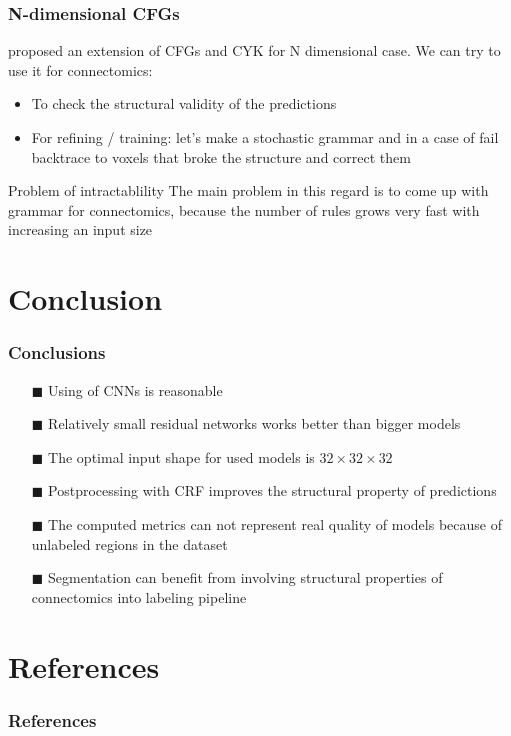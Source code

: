 \documentclass{beamer}
\begin{document}
\begin{frame}
    \frametitle{N-dimensional CFGs}
    \cite{schlesinger2013ten} proposed an extension of CFGs and CYK for N dimensional case. We can try to use it
    for connectomics:
    \begin{itemize}
        \item To check the structural validity of the predictions
        \item For refining / training: let's make a stochastic grammar and in a case of fail backtrace to
              voxels that broke the structure and correct them
    \end{itemize}
    \begin{alertblock}{Problem of intractablility}
        The main problem in this regard is to come up with grammar for connectomics, because the
        number of rules grows very fast with increasing an input size
    \end{alertblock}
\end{frame}

\section*{Conclusion}

\begin{frame}
    \frametitle{Conclusions}

    \begin{itemize}
        \item[$\blacksquare$] Using of CNNs is reasonable
        \item[$\blacksquare$] Relatively small residual networks works better than bigger models
        \item[$\blacksquare$] The optimal input shape for used models is \( 32 \times 32 \times 32 \)
        \item[$\blacksquare$] Postprocessing with CRF improves the structural property of predictions
        \item[$\blacksquare$] The computed metrics can not represent real quality of models because of
              unlabeled regions in the dataset
        \item[$\blacksquare$] Segmentation can benefit from involving structural properties of connectomics
              into labeling pipeline
    \end{itemize}

\end{frame}

\section*{References}

\begin{frame}[allowframebreaks]
    \frametitle{References}

    
    
\end{frame}
\end{document}
